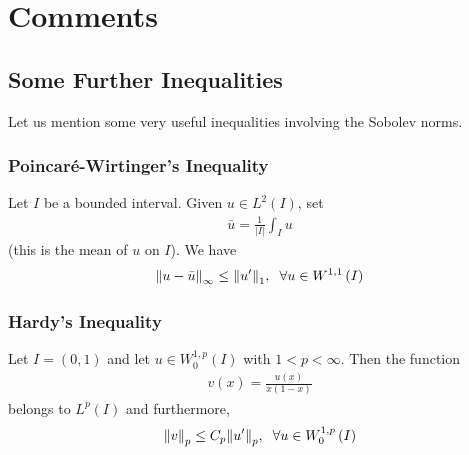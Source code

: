 \documentclass[a4paper,oneside]{book}
\numberwithin{equation}{chapter}
\begin{document}
\section{Comments}
\subsection{Some Further Inequalities}
Let us mention some very useful inequalities involving the Sobolev norms.
\subsubsection{Poincar\'{e}-Wirtinger's Inequality}
Let $I$ be a bounded interval. Given $u\in L^2\left(I\right)$, set 
\begin{align}
\bar u = \frac{1}{{\left| I \right|}}\int_I u 
\end{align}
(this is the mean of $u$ on $I$). We have
\begin{align}
{\left\| {u - \bar u} \right\|_\infty } \le {\left\| {u'} \right\|_1},\hspace{0.2cm}\forall u \in {W^{1,1}}\left( I \right)
\end{align}
\subsubsection{Hardy's Inequality}
Let $I=\left(0,1\right)$ and let $u\in W_0^{1,p}\left(I\right)$ with $1<p<\infty$. Then the function
\begin{align}
v\left( x \right) = \frac{{u\left( x \right)}}{{x\left( {1 - x} \right)}}
\end{align}
belongs to $L^p\left(I\right)$ and furthermore,
\begin{align}
{\left\| v \right\|_p} \le {C_p}{\left\| {u'} \right\|_p},\hspace{0.2cm} \forall u \in W_0^{1,p}\left( I \right)
\end{align}
\end{document}
